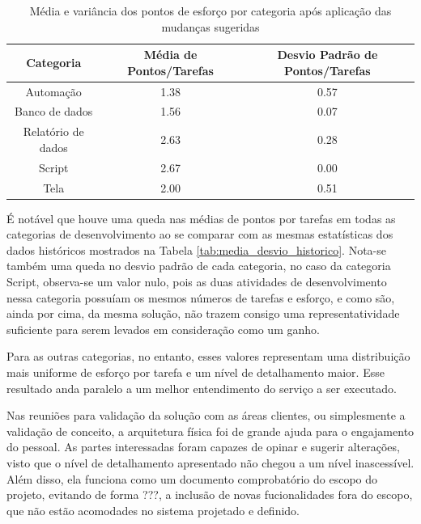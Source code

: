 	\begin{table}[!htb]
		\centering
		\begin{tabular}{ccc}
			\toprule
			\textbf{Categoria} & \textbf{Média de Pontos/Tarefas} & \textbf{Desvio Padrão de Pontos/Tarefas} \\
			\midrule
			Automação          & 1.38                             & 0.57                                 \\
			Banco de dados     & 1.56                             & 0.07                                 \\
			Relatório de dados & 2.63                             & 0.28                                 \\
			Script             & 2.67                             & 0.00                                 \\
			Tela               & 2.00                             & 0.51                                 \\
			\bottomrule
		\end{tabular}
		\caption{Média e variância dos pontos de esforço por categoria após aplicação das mudanças sugeridas}
		\label{tab:media_variancia_resultado}
	\end{table}

	É notável que houve uma queda nas médias de pontos por tarefas em todas as categorias de desenvolvimento ao se comparar com as mesmas estatísticas dos dados históricos mostrados na Tabela
	\ref{tab:media_desvio_historico}. Nota-se também uma queda no desvio padrão de cada categoria, no caso da categoria Script, observa-se um valor nulo, pois as duas atividades de desenvolvimento nessa categoria
	possuíam os mesmos números de tarefas e esforço, e como são, ainda por cima, da mesma solução, não trazem consigo uma representatividade suficiente para serem levados em consideração como um ganho.

	Para as outras categorias, no entanto, esses valores representam uma distribuição mais uniforme de esforço por tarefa e um nível de detalhamento maior. Esse resultado anda paralelo a 
	um melhor entendimento do serviço a ser executado.

	Nas reuniões para validação da solução com as áreas clientes, ou simplesmente a validação de conceito, a arquitetura física foi de grande ajuda para o engajamento do pessoal. As partes interessadas
	foram capazes de opinar e sugerir alterações, visto que o nível de detalhamento apresentado não chegou a um nível inascessível. Além disso, ela funciona como um documento comprobatório do escopo do projeto, evitando  de forma {\color{red} ???}, a
	inclusão de novas fucionalidades fora do escopo, que não estão acomodades no sistema projetado e definido.


